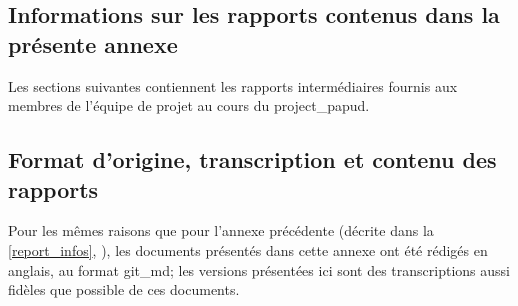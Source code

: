 

\begin{nohyphen}
\section{Informations sur les rapports contenus dans la présente annexe}
Les sections suivantes contiennent les rapports intermédiaires fournis aux membres de l'équipe de projet au cours du \gls{project_papud}.

\subsection{Format d'origine, transcription et contenu des rapports}
Pour les mêmes raisons que pour l'annexe précédente (décrite dans la \autoref{report_infos}, ), les documents présentés dans cette annexe ont été rédigés en anglais, au format \gls{git_md}; les versions présentées ici sont des transcriptions aussi fidèles que possible de ces documents.

\end{nohyphen}

